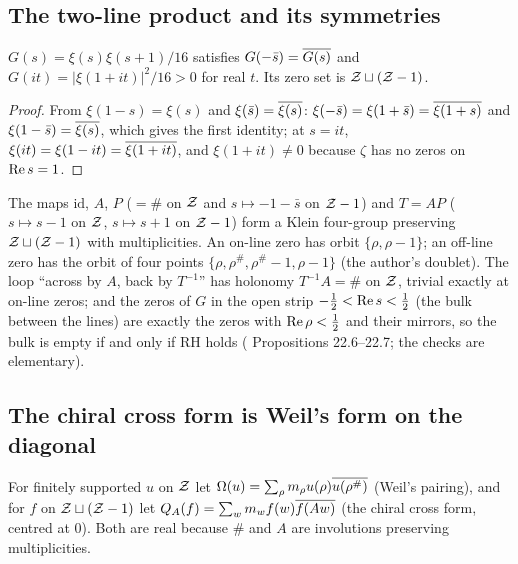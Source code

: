 \subsection{The two-line product and its symmetries}

\begin{proposition}\label{prop:G}
$G(s)=\xi(s)\xi(s+1)/16$ satisfies $G(-\bar s)=\overline{G(s)}$ and $G(it)=|\xi(1+it)|^2/16>0$ for real $t$. Its zero set is $\mathcal{Z}\sqcup(\mathcal{Z}-1)$.
\end{proposition}

\begin{proof}
From $\xi(1-s)=\xi(s)$ and $\xi(\bar s)=\overline{\xi(s)}$: $\xi(-\bar s)=\xi(1+\bar s)=\overline{\xi(1+s)}$ and $\xi(1-\bar s)=\overline{\xi(s)}$, which gives the first identity; at $s=it$, $\xi(it)=\xi(1-it)=\overline{\xi(1+it)}$, and $\xi(1+it)\ne0$ because $\zeta$ has no zeros on $\operatorname{Re} s=1$.
\end{proof}

The maps $\mathrm{id}$, $A$, $P$ ($=\#$ on $\mathcal{Z}$ and $s\mapsto-1-\bar s$ on $\mathcal{Z}-1$) and $T=AP$ ($s\mapsto s-1$ on $\mathcal{Z}$, $s\mapsto s+1$ on $\mathcal{Z}-1$) form a Klein four-group preserving $\mathcal{Z}\sqcup(\mathcal{Z}-1)$ with multiplicities. An on-line zero has orbit $\{\rho,\rho-1\}$; an off-line zero has the orbit of four points $\{\rho,\rho^\#,\rho^\#-1,\rho-1\}$ (the author's doublet). The loop ``across by $A$, back by $T^{-1}$'' has holonomy $T^{-1}A=\#$ on $\mathcal{Z}$, trivial exactly at on-line zeros; and the zeros of $G$ in the open strip $-\tfrac12<\operatorname{Re} s<\tfrac12$ (the bulk between the lines) are exactly the zeros with $\operatorname{Re}\rho<\tfrac12$ and their mirrors, so the bulk is empty if and only if RH holds ( Propositions 22.6--22.7; the checks are elementary).

\subsection{The chiral cross form is Weil's form on the diagonal}

For finitely supported $u$ on $\mathcal{Z}$ let $\Omega(u)=\sum_\rho m_\rho u(\rho)\overline{u(\rho^\#)}$ (Weil's pairing), and for $f$ on $\mathcal{Z}\sqcup(\mathcal{Z}-1)$ let $Q_A(f)=\sum_wm_wf(w)\overline{f(Aw)}$ (the chiral cross form, centred at $0$). Both are real because $\#$ and $A$ are involutions preserving multiplicities.

